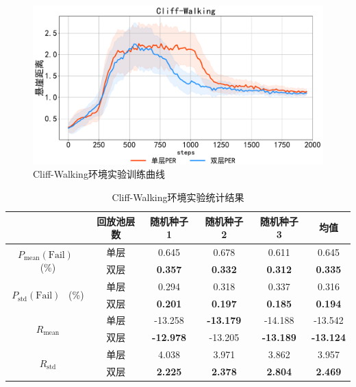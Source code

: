 \begin{figure}[t]
\centering
\includegraphics[width=\textwidth]{figures/cliffwalking.pdf}
\caption{Cliff-Walking环境实验训练曲线}
\label{fig:cliff-dis}
\end{figure}

\begin{table}[ht]
\centering
\caption{Cliff-Walking环境实验统计结果}
\begin{tabular}{cccccc} 
\toprule
& \textbf{回放池层数}  & \textbf{随机种子 1}  & \textbf{随机种子 2}  & \textbf{随机种子 3}   & \textbf{均值} \\ 
\midrule
\multirow{2}{*}{$P_\text{mean}(\text{Fail})$~ (\%)} & 单层 & 0.645            & 0.678            & 0.611            & 0.645             \\ 
                                                    & 双层 & \textbf{0.357}   & \textbf{0.332}   & \textbf{0.312}   & \textbf{0.335}    \\ 
\multirow{2}{*}{$P_\text{std}(\text{Fail})$~ (\%)}  & 单层 & 0.294            & 0.318            & 0.337            & 0.316             \\ 
                                                    & 双层 & \textbf{0.201}   & \textbf{0.197}   & \textbf{0.185}   & \textbf{0.194}    \\ 
\multirow{2}{*}{$R_\text{mean}$}                    & 单层 & -13.258          & \textbf{-13.179} & -14.188          & -13.542           \\ 
                                                    & 双层 & \textbf{-12.978} & -13.205          & \textbf{-13.189} & \textbf{-13.124}  \\ 
\multirow{2}{*}{$R_\text{std}$}                     & 单层 & 4.038            & 3.971            & 3.862            & 3.957             \\ 
                                                    & 双层 & \textbf{2.225}   & \textbf{2.378}   & \textbf{2.804}   & \textbf{2.469}    \\
\bottomrule
\end{tabular}
\label{tab:cliff-stats}
\end{table}


